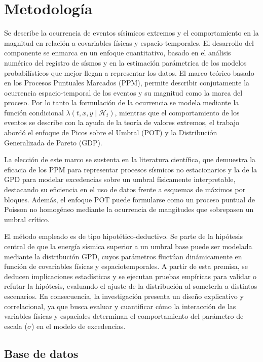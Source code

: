 \chapter{Metodología}
Se describe la ocurrencia de eventos sísimicos extremos y el comportamiento en la magnitud en relación a covariables
físicas y espacio-temporales. El desarrollo del componente se enmarca en un enfoque cuantitativo, basado en el análisis numérico
del registro de sísmos y en la estimación parámetrica de los modelos probabilísticos que mejor
llegan a representar los datos. El marco teórico basado en los Procesos Puntuales Marcados (PPM), permite
describir conjutamente la ocurrencia espacio-temporal de los eventos y su magnitud como la marca del proceso. Por lo tanto
la formulación de la ocurrencia se modela mediante la función condicional  $\lambda(t,x,y \mid \mathcal{H}_t)$, mientras que
el comportamiento de los eventos se describe con la ayuda de la teoría de valores extremos, el trabajo abordó el enfoque de Picos
sobre el Umbral (POT) y la Distribución Generalizada de Pareto (GDP).

La elección de este marco se sustenta en la literatura científica, que demuestra la eficacia de los PPM para representar procesos 
sísmicos no estacionarios y la de la GPD para modelar excedencias sobre un umbral físicamente interpretable, destacando su 
eficiencia en el uso de datos frente a esquemas de máximos por bloques. Además, el enfoque POT puede formularse como un proceso
puntual de Poisson no homogéneo mediante la ocurrencia de mangitudes que sobrepasen un umbral crítico.

El método empleado es de tipo hipotético-deductivo. Se parte de la hipótesis central de que la energía sísmica superior a un umbral base puede ser modelada mediante la distribución GPD, 
cuyos parámetros fluctúan dinámicamente en función de covariables físicas y espaciotemporales. A partir de esta premisa, se deducen implicaciones estadísticas y se ejecutan pruebas empíricas 
para validar o refutar la hipótesis, evaluando el ajuste de la distribución al someterla a distintos escenarios. En consecuencia, la investigación presenta un diseño explicativo y correlacional, 
ya que busca evaluar y cuantificar cómo la interacción de las variables físicas y espaciales determinan el comportamiento del parámetro de escala ($\sigma$) en el modelo de excedencias.
\section{Base de datos}


